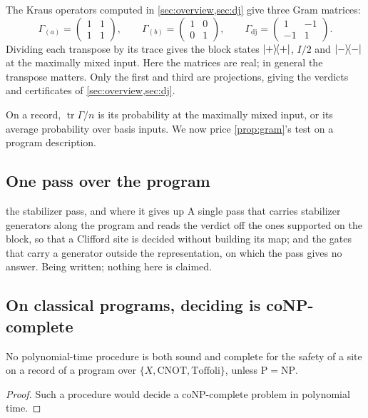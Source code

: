\documentclass[acmsmall,screen,review,anonymous,nonacm]{acmart}
\begin{document}
The Kraus operators computed in \cref{sec:overview,sec:dj} give
three Gram matrices:
\[
  \Gamma_{(a)} = \begin{pmatrix}1 & 1\\ 1 & 1\end{pmatrix},
  \qquad
  \Gamma_{(b)} = \begin{pmatrix}1 & 0\\ 0 & 1\end{pmatrix},
  \qquad
  \Gamma_{\mathrm{dj}} = \begin{pmatrix}1 & -1\\ -1 & 1\end{pmatrix} .
\]
Dividing each transpose by its trace gives the block states
$\lvert + \rangle\!\langle + \rvert$, $I/2$ and $\lvert - \rangle\!\langle - \rvert$ at the maximally mixed input.
Here the matrices are real; in general the transpose matters.
Only the first and third are projections, giving the verdicts and
certificates of \cref{sec:overview,sec:dj}.

On a record, $\operatorname{tr}\Gamma/n$ is its probability at the
maximally mixed input, or its average probability over basis inputs.
We now price \cref{prop:gram}'s test on a program description.

\subsection{One pass over the program}

\begin{planned}{the stabilizer pass, and where it gives up}
A single pass that carries stabilizer generators along the program and reads
the verdict off the ones supported on the block, so that a Clifford site is
decided without building its map; and the gates that carry a generator
outside the representation, on which the pass gives no answer.
Being written; nothing here is claimed.
\end{planned}

\subsection{On classical programs, deciding is coNP-complete}\label{sec:classicalcost}

\stmtClassicalCostSite

\begin{corollary}\label{cor:incomplete}
No polynomial-time procedure is both sound and complete for the safety
of a site on a record of a program over $\{X, \mathrm{CNOT}, \mathrm{Toffoli}\}$, unless
$\mathrm{P} = \mathrm{NP}$.
\end{corollary}
\begin{proof}
Such a procedure would decide a coNP-complete problem in polynomial time.
\end{proof}
\end{document}
